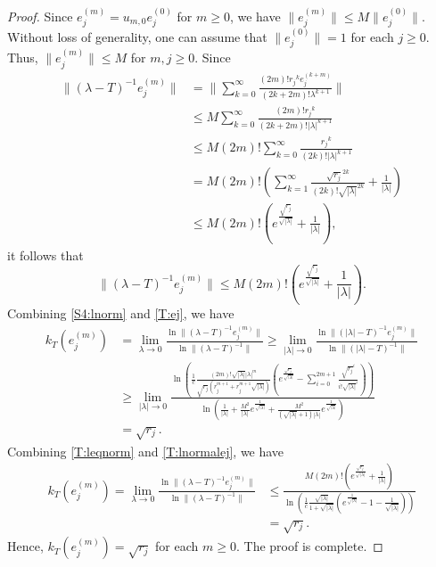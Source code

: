 \documentclass[12pt]{amsart}
\numberwithin{equation}{section}
\theoremstyle{plain}
\theoremstyle{definition}
\begin{document}
\begin{proof}
Since $e_j^{(m)}=u_{m,0}e_{j}^{(0)}$ for $m\geq 0$, we have $\|e_j^{(m)}\|\leq M \|e_{j}^{(0)}\|$.
Without loss of generality, one can assume that $\|e_{j}^{(0)}\|=1$ for each $j\geq 0$.
Thus, $\|e_j^{(m)}\|\leq M$ for $m,j\geq 0$.
Since
\begin{align*}
\|(\lambda-T)^{-1}e_j^{(m)}\|
&=\|\sum_{k=0}^{\infty}\frac{(2m)!{r_j}^k e_j^{(k+m)}}{(2k+2m)!\lambda^{k+1}}\|\\
&\leq
M\sum_{k=0}^{\infty}\frac{(2m)!{r_j}^k}{(2k+2m)!|\lambda|^{k+1}}\\
&\leq
M(2m)!\sum_{k=0}^{\infty}\frac{{r_j}^k}{(2k)!|\lambda|^{k+1}}\\
&=
M(2m)!\left(\sum_{k=1}^{\infty}\frac{\sqrt{{r_j}}^{2k}}{(2k)!\sqrt{|\lambda|}^{2k}}+\frac{1}{|\lambda|}\right)\\
&\leq
M(2m)!\left(e^{\frac{\sqrt{r_j}}{\sqrt{|\lambda|}}}+\frac{1}{|\lambda|}\right),
\end{align*}
it follows that
\begin{equation}\label{T:lnormalej}
\|(\lambda-T)^{-1}e_j^{(m)}\|\leq
M(2m)!\left(e^{\frac{\sqrt{r_j}}{\sqrt{|\lambda|}}}+\frac{1}{|\lambda|}\right).
\end{equation}
Combining \eqref{S4:lnorm} and \eqref{T:ej}, we have
\begin{align*}
k_{T}(e_j^{(m)})&=
\lim_{\lambda\rightarrow 0}
\frac{\ln \|(\lambda-T)^{-1}e_j^{(m)}\|}{\ln\|(\lambda-T)^{-1}\|}
\geq
\lim_{|\lambda|\rightarrow 0}
\frac{\ln \|(|\lambda|-T)^{-1}e_j^{(m)}\|}{\ln\|(|\lambda|-T)^{-1}\|}\\
&\geq\lim_{|\lambda|\rightarrow 0}
\frac{\ln\left(\frac{1}{c}\frac{(2m)!\sqrt{|\lambda|}|\lambda|^{m}}{\sqrt{r_j}(r_j^{m+1}+r_j^{m+1}\sqrt{|\lambda|})}
\left(e^{\frac{\sqrt{r_j}}{\sqrt{|\lambda|}}}-\sum_{i=0}^{2m+1}\frac{\sqrt{r_j}^i}{i!\sqrt{|\lambda|}^{i}}\right)\right)}
{\ln\left(\frac{1}{|\lambda|}+ \frac{M^2}{|\lambda|}e^{\frac{1}{\sqrt{|\lambda|}}}+
\frac{M^2}{(\sqrt{|\lambda|}+1)|\lambda|}e^{\frac{1}{\sqrt{|\lambda|}}}\right)}\\
&=\sqrt{r_j}.
\end{align*}
Combining \eqref{T:leqnorm} and \eqref{T:lnormalej}, we have
\begin{align*}
k_{T}(e_j^{(m)})=
\lim_{\lambda\rightarrow 0}
\frac{\ln \|(\lambda-T)^{-1}e_j^{(m)}\|}{\ln\|(\lambda-T)^{-1}\|}
&\leq
\frac{M(2m)!\left(e^{\frac{\sqrt{r_j}}{\sqrt{|\lambda|}}}+\frac{1}{|\lambda|}\right)}
{\ln\left(\frac{1}{c}\frac{\sqrt{|\lambda|}}{1+\sqrt{|\lambda|}}\left(e^{\frac{1}{\sqrt{|\lambda|}}}-1-\frac{1}{\sqrt{|\lambda|}}\right)\right)}\\
&=\sqrt{r_j}.
\end{align*}
Hence, $k_{T}(e_j^{(m)})=\sqrt{r_j}$ for each $m\geq 0$.
The proof is complete.
\end{proof}
\end{document}
